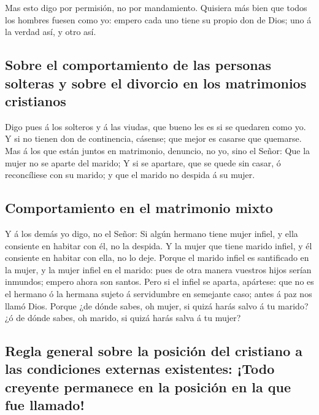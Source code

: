  Mas esto digo por permisión, no por mandamiento.
 Quisiera más bien que todos los hombres fuesen como yo:
empero cada uno tiene su propio don de Dios; uno á la verdad así, y otro
así.

\hypertarget{sobre-el-comportamiento-de-las-personas-solteras-y-sobre-el-divorcio-en-los-matrimonios-cristianos}{%
\subsection{Sobre el comportamiento de las personas solteras y sobre el
divorcio en los matrimonios
cristianos}\label{sobre-el-comportamiento-de-las-personas-solteras-y-sobre-el-divorcio-en-los-matrimonios-cristianos}}

 Digo pues á los solteros y á las viudas, que bueno les es
si se quedaren como yo.  Y si no tienen don de
continencia, cásense; que mejor es casarse que quemarse. 
Mas á los que están juntos en matrimonio, denuncio, no yo, sino el
Señor: Que la mujer no se aparte del marido;  Y si se
apartare, que se quede sin casar, ó reconcíliese con su marido; y que el
marido no despida á su mujer.

\hypertarget{comportamiento-en-el-matrimonio-mixto}{%
\subsection{Comportamiento en el matrimonio
mixto}\label{comportamiento-en-el-matrimonio-mixto}}

 Y á los demás yo digo, no el Señor: Si algún hermano
tiene mujer infiel, y ella consiente en habitar con él, no la despida.
 Y la mujer que tiene marido infiel, y él consiente en
habitar con ella, no lo deje.  Porque el marido infiel es
santificado en la mujer, y la mujer infiel en el marido: pues de otra
manera vuestros hijos serían inmundos; empero ahora son santos.
 Pero si el infiel se aparta, apártese: que no es el
hermano ó la hermana sujeto á servidumbre en semejante caso; antes á paz
nos llamó Dios.  Porque ¿de dónde sabes, oh mujer, si
quizá harás salvo á tu marido? ¿ó de dónde sabes, oh marido, si quizá
harás salva á tu mujer?

\hypertarget{regla-general-sobre-la-posiciuxf3n-del-cristiano-a-las-condiciones-externas-existentes-todo-creyente-permanece-en-la-posiciuxf3n-en-la-que-fue-llamado}{%
\subsection{Regla general sobre la posición del cristiano a las
condiciones externas existentes: ¡Todo creyente permanece en la posición
en la que fue
llamado!}\label{regla-general-sobre-la-posiciuxf3n-del-cristiano-a-las-condiciones-externas-existentes-todo-creyente-permanece-en-la-posiciuxf3n-en-la-que-fue-llamado}}


